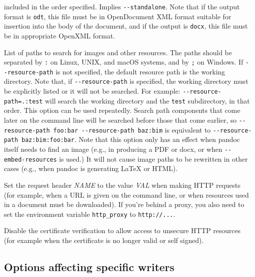 \documentclass[
]{article}
\begin{document}
\begin{description}
included in the order specified. Implies \texttt{-\/-standalone}. Note
that if the output format is \texttt{odt}, this file must be in
OpenDocument XML format suitable for insertion into the body of the
document, and if the output is \texttt{docx}, this file must be in
appropriate OpenXML format.
\item[\texttt{-\/-resource-path=}\emph{SEARCHPATH}]
List of paths to search for images and other resources. The paths should
be separated by \texttt{:} on Linux, UNIX, and macOS systems, and by
\texttt{;} on Windows. If \texttt{-\/-resource-path} is not specified,
the default resource path is the working directory. Note that, if
\texttt{-\/-resource-path} is specified, the working directory must be
explicitly listed or it will not be searched. For example:
\texttt{-\/-resource-path=.:test} will search the working directory and
the \texttt{test} subdirectory, in that order. This option can be used
repeatedly. Search path components that come later on the command line
will be searched before those that come earlier, so
\texttt{-\/-resource-path\ foo:bar\ -\/-resource-path\ baz:bim} is
equivalent to \texttt{-\/-resource-path\ baz:bim:foo:bar}. Note that
this option only has an effect when pandoc itself needs to find an image
(e.g., in producing a PDF or docx, or when \texttt{-\/-embed-resources}
is used.) It will not cause image paths to be rewritten in other cases
(e.g., when pandoc is generating LaTeX or HTML).
\item[\texttt{-\/-request-header=}\emph{NAME}\texttt{:}\emph{VAL}]
Set the request header \emph{NAME} to the value \emph{VAL} when making
HTTP requests (for example, when a URL is given on the command line, or
when resources used in a document must be downloaded). If you're behind
a proxy, you also need to set the environment variable
\texttt{http\_proxy} to \texttt{http://...}.
\item[\texttt{-\/-no-check-certificate{[}=true\textbar{}false{]}}]
Disable the certificate verification to allow access to unsecure HTTP
resources (for example when the certificate is no longer valid or self
signed).
\end{description}

\hypertarget{options-affecting-specific-writers}{%
\subsection{Options affecting specific
writers}\label{options-affecting-specific-writers}}
\end{document}
